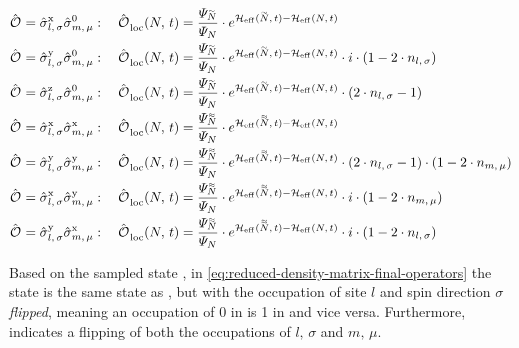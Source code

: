\begin{equation}
    \label{eq:reduced-density-matrix-final-operators}
    \begin{split}
        \ObservableOp = \pauli[l,\,\sigma]{x} \pauli[m,\,\mu]{0}   &: \quad \localObservable{N}{t} =
        \frac{\psiN[\vphantom{N}\smash{\tilde{N}}]}{\psiN}        \cdot         e^{\HeffOft[\vphantom{N}\smash{\tilde{N}}]-\HeffOft[N]}
        \\
        \ObservableOp = \pauli[l,\,\sigma]{y} \pauli[m,\,\mu]{0}   &: \quad \localObservable{N}{t} =
        \frac{\psiN[\vphantom{N}\smash{\tilde{N}}]}{\psiN}        \cdot         e^{\HeffOft[\vphantom{N}\smash{\tilde{N}}]-\HeffOft[N]} \cdot i \cdot (1-2 \cdot n_{l,\,\sigma}) 
        \\
        \ObservableOp = \pauli[l,\,\sigma]{z} \pauli[m,\,\mu]{0}   &: \quad \localObservable{N}{t} =
        \frac{\psiN[\vphantom{N}\smash{\tilde{N}}]}{\psiN}        \cdot         e^{\HeffOft[\vphantom{N}\smash{\tilde{N}}]-\HeffOft[N]} \cdot (2 \cdot n_{l,\,\sigma} - 1) 
        \\
        \ObservableOp = \pauli[l,\,\sigma]{x} \pauli[m,\,\mu]{x}   &: \quad \localObservable{N}{t} =
        \frac{\psiN[\vphantom{N}\smash{\tildetilde{N}}]}{\psiN}        \cdot         e^{\HeffOft[\vphantom{N}\smash{\tildetilde{N}}]-\HeffOft[N]}
        \\
        \ObservableOp = \pauli[l,\,\sigma]{y} \pauli[m,\,\mu]{y}   &: \quad \localObservable{N}{t} =
        \frac{\psiN[\vphantom{N}\smash{\tildetilde{N}}]}{\psiN}        \cdot         e^{\HeffOft[\vphantom{N}\smash{\tildetilde{N}}]-\HeffOft[N]} \cdot (2 \cdot n_{l,\,\sigma} - 1) \cdot (1- 2 \cdot n_{m,\,\mu})
        \\
        \ObservableOp = \pauli[l,\,\sigma]{x} \pauli[m,\,\mu]{y}   &: \quad \localObservable{N}{t} =
        \frac{\psiN[\vphantom{N}\smash{\tildetilde{N}}]}{\psiN}        \cdot         e^{\HeffOft[\vphantom{N}\smash{\tildetilde{N}}]-\HeffOft[N]} \cdot i \cdot (1-2 \cdot n_{m,\,\mu}) 
        \\
        \ObservableOp = \pauli[l,\,\sigma]{y} \pauli[m,\,\mu]{x}   &: \quad \localObservable{N}{t} =
        \frac{\psiN[\vphantom{N}\smash{\tildetilde{N}}]}{\psiN}        \cdot         e^{\HeffOft[\vphantom{N}\smash{\tildetilde{N}}]-\HeffOft[N]} \cdot i \cdot (1-2 \cdot n_{l,\,\sigma}) 
    \end{split}
\end{equation}

Based on the sampled state \ketN[N], in \autoref{eq:reduced-density-matrix-final-operators} the state  is the same state as \ketN[N], but with the occupation of site $l$ and spin direction $\sigma$ \emph{flipped}, meaning an occupation of 0 in \ketN[N] is 1 in  and vice versa.
Furthermore,  indicates a flipping of both the occupations of $l,\, \sigma$ and $m,\, \mu$.

